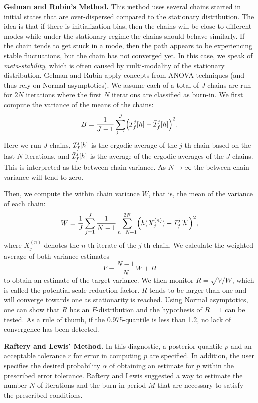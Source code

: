 \medskip
\noindent\textbf{Gelman and Rubin's Method.}
This method uses several chains started in initial states that are
over-dispersed compared to the stationary distribution. The idea is that if there is initialization
bias, then the chains will be close to different modes while under the stationary regime the chains
should behave similarly. If the chain tends to get stuck in a mode, then the path appears to be
experiencing stable fluctuations, but the chain has not converged yet. In this case, we speak of
\textit{meta-stability}, which is often caused by multi-modality of the stationary distribution. Gelman
and Rubin apply concepts from ANOVA techniques (and thus rely on Normal asymptotics). We
assume each of a total of $J$ chains are run for $2N$ iterations where the first $N$ iterations are
classified as burn-in. We first compute the variance of the means of the chains:
\[
  B = \frac{1}{J-1} \sum_{j=1}^{J} \Bigl(\mathcal{I}_f^j[h] - \bar{\mathcal{I}}_f^j[h]\Bigr)^2.
\]
Here we run $J$ chains, $\mathcal{I}_f^j[h]$ is the ergodic average of the $j$-th chain based on the last $N$ iterations,
and $\bar{\mathcal{I}}_f^j[h]$ is the average of the ergodic averages of the $J$ chains. This is interpreted as the between
chain variance. As $N \to \infty$ the between chain variance will tend to zero.

Then, we compute the within chain variance $W$, that is, the mean of the variance of each
chain:
\[
  W = \frac{1}{J} \sum_{j=1}^{J} \frac{1}{N-1} \sum_{n=N+1}^{2N}
      \Bigl(h(X_j^{(n)}) - \mathcal{I}_f^j[h]\Bigr)^2,
\]
where $X_j^{(n)}$ denotes the $n$-th iterate of the $j$-th chain. We calculate the weighted average of both
variance estimates
\[
  V = \frac{N-1}{N}\, W + B
\]
to obtain an estimate of the target variance. We then monitor $R = \sqrt{V/W}$, which is called the
potential scale reduction factor. $R$ tends to be larger than one and will converge towards one as
stationarity is reached. Using Normal asymptotics, one can show that $R$ has an $F$-distribution
and the hypothesis of $R = 1$ can be tested. As a rule of thumb, if the 0.975-quantile is less than
1.2, no lack of convergence has been detected.

\medskip
\noindent\textbf{Raftery and Lewis' Method.}
In this diagnostic, a posterior quantile $p$ and an acceptable
tolerance $r$ for error in computing $p$ are specified. In addition, the user specifies the desired
probability $\alpha$ of obtaining an estimate for $p$ within the prescribed error tolerance. Raftery and
Lewis suggested a way to estimate the number $N$ of iterations and the burn-in period $M$ that are
necessary to satisfy the prescribed conditions.
